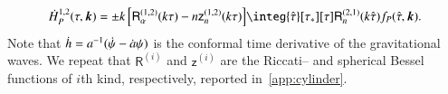     \begin{equation}\label{eq:pertwalls:gws:Hdot_P_12}
        \dot{H}_P^{1,2}(\tau, \vec{k})  = \pm k \,\bclosed{ \mathsf{R}_\alpha^{(1,2)}(k\tau) -  n\mathsf{z}^{(1,2)}_n(k\tau) } \integ{\dummy{\tau}}[\tau_\ast][\tau] \mathsf{R}_n^{(2,1)}(k\dummy{\tau})  \Src_P(\dummy{\tau}, \vec{k}).
    \end{equation}
    Note that $\dot{h} = a^{-1} ( \dot{\psi} - \dot{a} \psi)$ is the conformal time derivative of the gravitational waves. 
    We repeat that $\mathsf{R}^{(i)}$ and $\mathsf{z}^{(i)}$ are the Riccati-- and spherical Bessel functions of $i$th kind, respectively, reported in~\cref{app:cylinder}.








